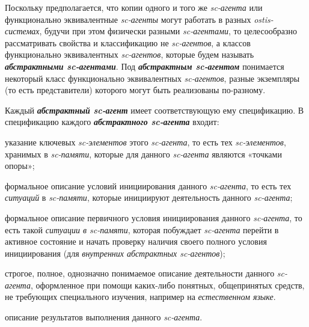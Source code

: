 Поскольку предполагается, что копии одного и того же \textit{sc-агента} или функционально эквивалентные \textit{sc-агенты} могут работать в разных \textit{ostis-системах}, будучи при этом физически разными \textit{sc-агентами}, то целесообразно рассматривать свойства и классификацию не \textit{sc-агентов}, а классов функционально эквивалентных \textit{sc-агентов}, которые будем называть \textbf{\textit{абстрактными sc-агентами}}.
Под \textbf{\textit{абстрактным sc-агентом}} понимается некоторый класс функционально эквивалентных \textit{sc-агентов}, разные экземпляры (то есть представители) которого могут быть реализованы по-разному.
	
Каждый \textbf{\textit{абстрактный sc-агент}} имеет соответствующую ему спецификацию. В спецификацию каждого \textbf{\textit{абстрактного sc-агента}} входит:
\begin{textitemize}
	\item указание ключевых \textit{sc-элементов} этого \textit{sc-агента}, то есть тех \textit{sc-элементов}, хранимых в \textit{sc-памяти}, которые для данного \textit{sc-агента} являются «точками опоры»;
	\item формальное описание условий инициирования данного \textit{sc-агента}, то есть тех \textit{ситуаций} в \textit{sc-памяти}, которые инициируют деятельность данного \textit{sc-агента};
	\item формальное описание первичного условия инициирования данного \textit{sc-агента}, то есть такой \textit{ситуации в sc-памяти}, которая побуждает \textit{sc-агента} перейти в активное состояние и начать проверку наличия своего полного условия инициирования (для \textit{внутренних абстрактных sc-агентов});
	\item строгое, полное, однозначно понимаемое описание деятельности данного \textit{sc-агента}, оформленное при помощи каких-либо понятных, общепринятых средств, не требующих специального изучения, например на \textit{естественном языке}.
	\item описание результатов выполнения данного \textit{sc-агента}.
\end{textitemize}


